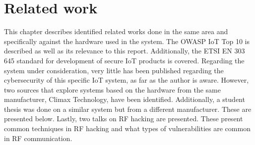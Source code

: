 \chapter{Related work} \label{ch:related-work}
This chapter describes identified related works done in the same area and specifically against the hardware used in the system. The OWASP IoT Top 10 is described as well as its relevance to this report. Additionally, the ETSI EN 303 645 standard for development of secure IoT products is covered. Regarding the system under consideration, very little has been published regarding the cybersecurity of this specific IoT system, as far as the author is aware. However, two sources that explore systems based on the hardware from the same manufacturer, Climax Technology, have been identified. Additionally, a student thesis was done on a similar system but from a different manufacturer. These are presented below. Lastly, two talks on RF hacking are presented. These present common techniques in RF hacking and what types of vulnerabilities are common in RF communication.

